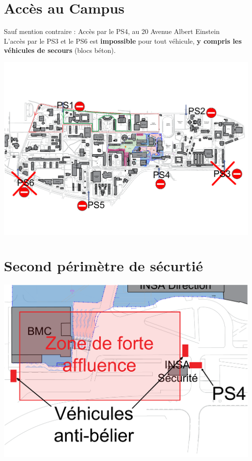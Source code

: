 \documentclass[hidelinks, paper=a4, fontsize=13pt]{report}
\begin{document}
\section{Accès au Campus}
Sauf mention contraire : Accès par le PS4, au 20 Avenue Albert Einstein\\
L'accès par le PS3 et le PS6 est \textbf{impossible} pour tout véhicule, \textbf{y compris les véhicules de secours} (blocs béton).
	\begin{center}\includegraphics[width=.9\textheight, angle=90]{Exports/Plan_24h_45eme-Points_Secu}\end{center}

\section{Second périmètre de sécurtié}
	\begin{center}\includegraphics[width=.95\textheight, angle=90]{Exports/Plan_24h_45eme-Vehicules_beliers}\end{center}
\end{document}
